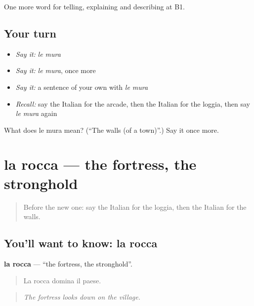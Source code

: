 \begin{grammarlens}[title={What you've built}]
One more word for telling, explaining and describing at B1.
\end{grammarlens}

\subsection*{Your turn}
\begin{itemize}
\raggedright
  \item \emph{Say it:} \emph{le mura}
  \item \emph{Say it:} \emph{le mura}, once more
  \item \emph{Say it:} a sentence of your own with \emph{le mura}
  \item \emph{Recall:} say the Italian for the arcade, then the Italian for the loggia, then say \emph{le mura} again
\end{itemize}

\begin{tcolorbox}[breakable,colback=teal!4,colframe=teal!35!black,title={Before you move on}]
What does le mura mean? (\textquotedblleft{}The walls (of a town)\textquotedblright{}.) Say it once more.
\end{tcolorbox}
\section[la rocca]{la rocca — the fortress, the stronghold}

\label{lesson:IT-C446-rocca}



\begin{quote}
Before the new one: say the Italian for the loggia, then the Italian for the walls.
\end{quote}

\subsection*{You'll want to know: la rocca}
\textbf{la rocca} — \textquotedblleft{}the fortress, the stronghold\textquotedblright{}.

\begin{quote}
La rocca domina il paese.
\end{quote}

\begin{quote}
\emph{The fortress looks down on the village.}
\end{quote}

